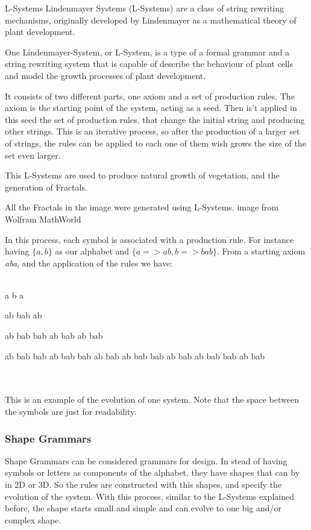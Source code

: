 L-Systems
Lindenmayer Systems (L-Systems) are a class of string rewriting mechanisms, originally developed by Lindenmayer as a mathematical theory of plant development.

One Lindenmayer-System, or L-System, is a type of a formal grammar and a string rewriting system that is capable of describe the behaviour of plant cells and model the growth processes of plant development.

It consists of two different parts, one axiom and a set of production rules. The axiom is the starting point of the system, acting as a seed. Then is't applied in this seed the set of production rules, that change the initial string and producing other strings.
This is an iterative process, so after the production of a larger set of strings, the rules can be applied to each one of them wish grows the size of the set even larger.

This L-Systems are used to produce natural growth of vegetation, and the generation of Fractals. 



All the Fractals in the image were generated using L-Systems. 
image from Wolfram MathWorld

In this process, each symbol is associated with a production rule. For instance having $\{a, b\}$ as our alphabet and $\{a=>ab, b=> bab\}$. From a starting axiom \emph{aba}, and the application of the rules we have:\\
\\
\centerline{a b a}
\centerline{ab bab ab}
\centerline{ab bab bab ab bab ab bab}
\centerline{ab bab bab ab bab bab ab bab ab bab bab ab bab ab bab bab ab bab}
\\
\\
This is an example of the evolution of one system. Note that the space between the symbols are just for readability.


\subsubsection{Shape Grammars} %
\label{ssub:shape_grammars}


Shape Grammars can be considered grammars for design. In stead of having symbols or letters as components of the alphabet, they have shapes that can by in 2D or 3D. So the rules are constructed with this shapes, and specify the evolution of the system. With this process, similar to the L-Systems explained before, the shape starts small and simple and can evolve to one big and/or complex shape.

